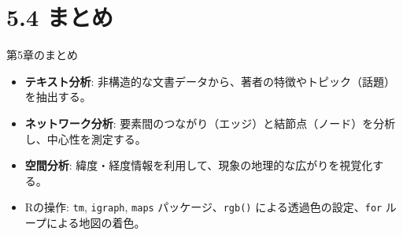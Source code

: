 \documentclass[
  ignorenonframetext,
]{beamer}
\providecommand{\tightlist}{%
  \setlength{\itemsep}{0pt}\setlength{\parskip}{0pt}}
\begin{document}
\section{5.4 まとめ}\label{ux307eux3068ux3081}

\begin{frame}[fragile]{第5章のまとめ}
\label{ux7b2c5ux7ae0ux306eux307eux3068ux3081}
\begin{itemize}
\tightlist
\item
  \textbf{テキスト分析}:
  非構造的な文書データから、著者の特徴やトピック（話題）を抽出する。
\item
  \textbf{ネットワーク分析}:
  要素間のつながり（エッジ）と結節点（ノード）を分析し、中心性を測定する。
\item
  \textbf{空間分析}:
  緯度・経度情報を利用して、現象の地理的な広がりを視覚化する。
\item
  Rの操作: \texttt{tm}, \texttt{igraph}, \texttt{maps}
  パッケージ、\texttt{rgb()} による透過色の設定、\texttt{for}
  ループによる地図の着色。
\end{itemize}
\end{frame}
\end{document}
